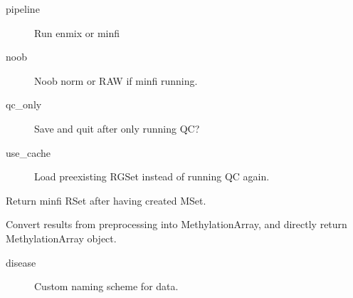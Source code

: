 \documentclass[letterpaper,10pt,english]{sphinxmanual}
\begin{document}
\begin{fulllineitems}
\begin{fulllineitems}
\begin{description}
\item[{pipeline}] \leavevmode
Run enmix or minfi

\item[{noob}] \leavevmode
Noob norm or RAW if minfi running.

\item[{qc\_only}] \leavevmode
Save and quit after only running QC?

\item[{use\_cache}] \leavevmode
Load preexisting RGSet instead of running QC again.

\end{description}

\end{fulllineitems}


\begin{fulllineitems}
\label{\detokenize{index:pymethylprocess.PreProcessDataTypes.PreProcessIDAT.return_beta}}
Return minfi RSet after having created MSet.

\end{fulllineitems}


\begin{fulllineitems}
\label{\detokenize{index:pymethylprocess.PreProcessDataTypes.PreProcessIDAT.to_methyl_array}}
Convert results from preprocessing into MethylationArray, and directly return MethylationArray object.
\begin{description}
\item[{disease}] \leavevmode
Custom naming scheme for data.

\end{description}

\end{fulllineitems}


\end{fulllineitems}

\end{document}
